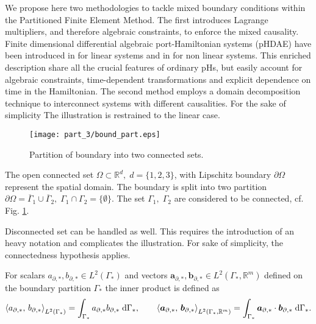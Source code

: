 We propose here two methodologies to tackle mixed boundary conditions within the Partitioned Finite Element Method. The first introduces Lagrange multipliers, and therefore algebraic constraints, to enforce the mixed causality. Finite dimensional differential algebraic port-Hamiltonian systems (pHDAE) have been introduced in \cite{beattie2018linear} for linear systems and in \cite{morandin2019} for non linear systems. This enriched description share all the crucial features of ordinary pHs, but easily account for algebraic constraints, time-dependent transformations and explicit dependence on time in the Hamiltonian. The second method employs a domain decomposition technique to interconnect systems with different causalities. For the sake of simplicity The illustration is restrained to the linear case. \\

\begin{figure}[tb]
	\centering
	\texttt{[image: part\_3/bound\_part.eps]}
	\caption{Partition of boundary into two connected sets.}
	\label{fig:bound_part}
\end{figure}

The open connected set $\Omega \subset \mathbb{R}^d, \; d=\{1,2,3\}$, with Lipschitz boundary $\partial\Omega$ represent the spatial domain. The boundary is split into two partition $\partial\Omega = \overline{\Gamma}_1 \cup \overline{\Gamma}_2, \; \Gamma_1 \cap \Gamma_2 = \{\emptyset\}$. The set $\Gamma_1, \; \Gamma_2$ are considered to be connected, cf. Fig. \ref{fig:bound_part}.

\begin{remark}
	Disconnected set can be handled as well. This requires the introduction of an heavy notation and complicates the illustration. For sake of simplicity, the connectedness hypothesis applies.
\end{remark}
For scalars ${a}_{\partial, *}, {b}_{\partial, *} \in L^2(\Gamma_*)$ and  vectors  $\bm{a}_{\partial, *}, \bm{b}_{\partial, *} \in L^2(\Gamma_*, \mathbb{R}^m)$ defined on the boundary partition $\Gamma_*$ the inner product is defined as
\begin{equation}
\inner[L^2(\Gamma_*)]{a_{\partial, *}}{b_{\partial, *}} = \int_{\Gamma_*} a_{\partial, *} b_{\partial, *} \d{\Gamma_*}, \qquad \inner[L^2(\Gamma_*, \mathbb{R}^m)]{\bm{a}_{\partial, *}}{\bm{b}_{\partial, *}} = \int_{\Gamma_*} \bm{a}_{\partial, *} \cdot \bm{b}_{\partial, *} \d{\Gamma_*}.  
\end{equation}   

